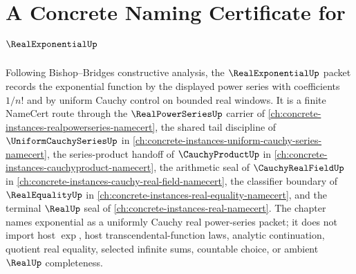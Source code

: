 \chapter{A Concrete Naming Certificate for $\RealExponentialUp$}
\label{ch:concrete-instances-real-exponential-namecert}

Following Bishop--Bridges constructive analysis, the $\RealExponentialUp$ packet records the exponential function by the displayed power series with coefficients $1/n!$ and by uniform Cauchy control on bounded real windows. It is a finite NameCert route through the $\RealPowerSeriesUp$ carrier of \autoref{ch:concrete-instances-realpowerseries-namecert}, the shared tail discipline of $\UniformCauchySeriesUp$ in \autoref{ch:concrete-instances-uniform-cauchy-series-namecert}, the series-product handoff of $\CauchyProductUp$ in \autoref{ch:concrete-instances-cauchyproduct-namecert}, the arithmetic seal of $\CauchyRealFieldUp$ in \autoref{ch:concrete-instances-cauchy-real-field-namecert}, the classifier boundary of $\RealEqualityUp$ in \autoref{ch:concrete-instances-real-equality-namecert}, and the terminal $\RealUp$ seal of \autoref{ch:concrete-instances-real-namecert}. The chapter names exponential as a uniformly Cauchy real power-series packet; it does not import host $\exp$, host transcendental-function laws, analytic continuation, quotient real equality, selected infinite sums, countable choice, or ambient $\RealUp$ completeness.

